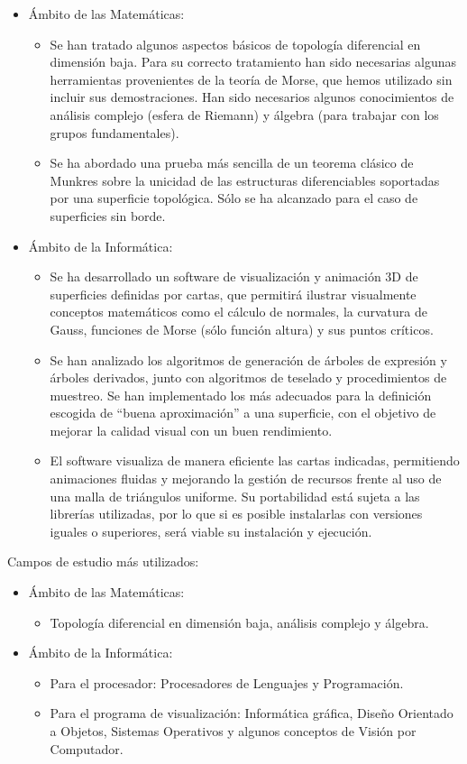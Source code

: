 \begin{itemize}
	\item Ámbito de las Matemáticas:
	\begin{itemize}
		\item Se han tratado algunos aspectos básicos de topología diferencial en dimensión baja. Para su correcto tratamiento han sido necesarias algunas herramientas provenientes de la teoría de Morse, que hemos utilizado sin incluir sus demostraciones. Han sido necesarios algunos conocimientos de análisis complejo (esfera de Riemann) y álgebra (para trabajar con los grupos fundamentales).
		\item Se ha abordado una prueba más sencilla de un teorema clásico de Munkres sobre la unicidad de las estructuras diferenciables soportadas por una superficie topológica. Sólo se ha alcanzado para el caso de superficies sin borde.
	\end{itemize}
	\item Ámbito de la Informática:
	\begin{itemize}
		\item Se ha desarrollado un software de visualización y animación $3$D de superficies definidas por cartas, que permitirá ilustrar visualmente conceptos matemáticos como el cálculo de normales, la curvatura de Gauss, funciones de Morse (sólo función altura) y sus puntos críticos.
		\item Se han analizado los algoritmos de generación de árboles de expresión y árboles derivados, junto con algoritmos de teselado y procedimientos de muestreo. Se han implementado los más adecuados para la definición escogida de ``buena aproximación'' a una superficie, con el objetivo de mejorar la calidad visual con un buen rendimiento.
		\item El software visualiza de manera eficiente las cartas indicadas, permitiendo animaciones fluidas y mejorando la gestión de recursos frente al uso de una malla de triángulos uniforme. Su portabilidad está sujeta a las librerías utilizadas, por lo que si es posible instalarlas con versiones iguales o superiores, será viable su instalación y ejecución.
	\end{itemize}
\end{itemize}
Campos de estudio más utilizados:
\begin{itemize}
	\item Ámbito de las Matemáticas:
	\begin{itemize}
		\item Topología diferencial en dimensión baja, análisis complejo y álgebra.
	\end{itemize}
	\item Ámbito de la Informática:
	\begin{itemize}
		\item Para el procesador: Procesadores de Lenguajes y Programación.
		\item Para el programa de visualización: Informática gráfica, Diseño Orientado a Objetos, Sistemas Operativos y algunos conceptos de Visión por Computador.
	\end{itemize}
\end{itemize}

\endinput
